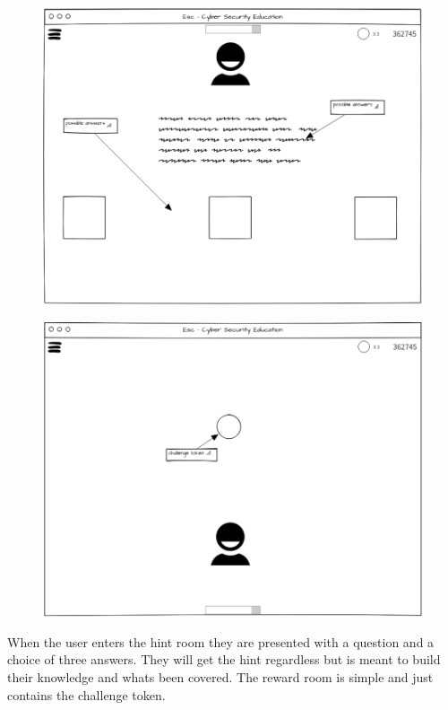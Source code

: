 \documentclass[12pt,a4paper]{article}
\begin{document}
\begin{figure}
\centering
\begin{minipage}{.5\textwidth}
  \centering
  \includegraphics[width=1\linewidth]{Ui_hint_room.PNG}
  \label{fig:test1}
\end{minipage}%
\begin{minipage}{.5\textwidth}
  \centering
  \includegraphics[width=1\linewidth]{Ui_reward_room.PNG}
  \label{fig:test2}
\end{minipage}
\end{figure}   

When the user enters the hint room they are presented with a question and a choice of three answers. They will get the hint regardless but is meant to build their knowledge and whats been covered. The reward room is simple and just contains the challenge token.
\end{document}
